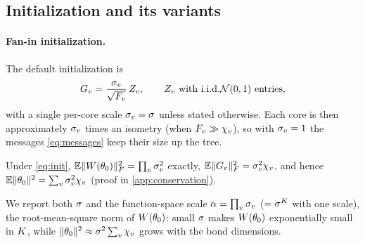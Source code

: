 \subsection{Initialization and its variants}\label{sec:setup-init}

\paragraph{Fan-in initialization.}
The default initialization is
\begin{equation}\label{eq:init}
  \G{v}=\frac{\iscv{v}}{\sqrt{\fanin{v}}}\,Z_v,\qquad Z_v \text{ with \iid } \Normal(0,1)
  \text{ entries},
\end{equation}
with a single per-core scale $\sigma_{v}=\sigma$ unless stated otherwise. Each core is then
approximately $\sigma_{v}$ times an isometry (when $F_{v}\gg\chi_{v}$), so with $\sigma_{v}=1$ the
messages \eqref{eq:messages} keep their size up the tree.

\begin{proposition}\label{prop:init-norm}
  \proven{} Under \eqref{eq:init}, $\mathbb{E}\lVert W(\theta_0)\rVert_{F}^2=\prod_{v}\sigma_{v}^2$ exactly,
  $\mathbb{E}\lVert G_{v}\rVert_{F}^2=\sigma_{v}^2\chi_{v}$, and hence $\mathbb{E}\lVert\theta_0\rVert^2=\sum_v\sigma_{v}^2\chi_{v}$
  (proof in \cref{app:conservation}).
\end{proposition}

We report both $\sigma$ and the function-space scale $\alpha=\prod_v\sigma_{v}$ ($=\sigma^{K}$ with one
scale), the root-mean-square norm of $W(\theta_0)$: small $\sigma$ makes $W(\theta_0)$
exponentially small in $K$, while $\lVert\theta_0\rVert^2\approx\sigma^2\sum_v\chi_{v}$ grows with the
bond dimensions.

